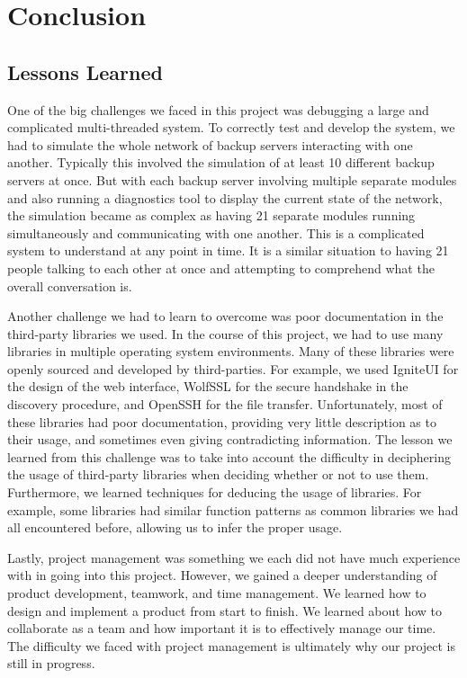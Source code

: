 \chapter{Conclusion}
\section{Lessons Learned}

One of the big challenges we faced in this project was debugging a large and complicated multi-threaded system.  To correctly test and develop the system, we had to simulate the whole network of backup servers interacting with one another.  Typically this involved the simulation of at least 10 different backup servers at once. But with each backup server involving multiple separate modules and also running a diagnostics tool to display the current state of the network, the simulation became as complex as having 21 separate modules running simultaneously and communicating with one another. This is a complicated system to understand at any point in time. It is a similar situation to having 21 people talking to each other at once and attempting to comprehend what the overall conversation is.

Another challenge we had to learn to overcome was poor documentation in the third-party libraries we used.  In the course of this project, we had to use many libraries in multiple operating system environments.  Many of these libraries were openly sourced and developed by third-parties.  For example, we used IgniteUI for the design of the web interface, WolfSSL for the secure handshake in the discovery procedure, and OpenSSH for the file transfer.  Unfortunately, most of these libraries had poor documentation, providing very little description as to their usage, and sometimes even giving contradicting information.  The lesson we learned from this challenge was to take into account the difficulty in deciphering the usage of third-party libraries when deciding whether or not to use them.  Furthermore, we learned techniques for deducing the usage of libraries.  For example, some libraries had similar function patterns as common libraries we had all encountered before, allowing us to infer the proper usage.

Lastly, project management was something we each did not have much experience with in going into this project.  However, we gained a deeper understanding of product development, teamwork, and time management. We learned how to design and implement a product from start to finish.  We learned about how to collaborate as a team and how important it is to effectively manage our time.  The difficulty we faced with project management is ultimately why our project is still in progress.  

